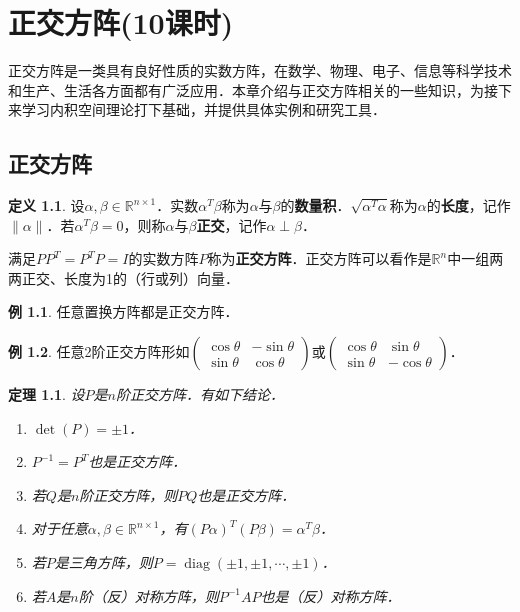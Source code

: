 \documentclass[a4paper,fontset=windows]{ctexbook}
\newtheorem{theorem}{定理}[chapter]
\theoremstyle{definition}
\newtheorem{definition}{定义}[chapter]
\newtheorem{example}{例}[chapter]
\DeclareMathOperator{\diag}{diag}
\begin{document}
\chapter{正交方阵(10课时)}%

正交方阵是一类具有良好性质的实数方阵，在数学、物理、电子、信息等科学技术和生产、生活各方面都有广泛应用．本章介绍与正交方阵相关的一些知识，为接下来学习内积空间理论打下基础，并提供具体实例和研究工具．

\section{正交方阵}

\begin{definition}
设$\alpha,\beta\in\mathbb{R}^{n\times 1}$．实数$\alpha^T\beta$称为$\alpha$与$\beta$的{\bf 数量积}．$\sqrt{\alpha^T\alpha}$称为$\alpha$的{\bf 长度}，记作$\|\alpha\|$．若$\alpha^T\beta=0$，则称$\alpha$与$\beta${\bf 正交}，记作$\alpha\perp\beta$．

满足$PP^T=P^TP=I$的实数方阵$P$称为{\bf 正交方阵}．正交方阵可以看作是$\mathbb{R}^n$中一组两两正交、长度为1的（行或列）向量．
\end{definition}

\begin{example}
任意置换方阵都是正交方阵．
\end{example}

\begin{example}
任意2阶正交方阵形如$\begin{pmatrix}\cos\theta&-\sin\theta \\ \sin\theta&\cos\theta\end{pmatrix}$或$\begin{pmatrix}\cos\theta&\sin\theta \\ \sin\theta&-\cos\theta\end{pmatrix}$．
\end{example}

\begin{theorem}\label{thm6.1}
设$P$是$n$阶正交方阵．有如下结论．
\begin{enumerate}
\item $\det(P)=\pm 1$．

\item $P^{-1}=P^T$也是正交方阵．

\item 若$Q$是$n$阶正交方阵，则$PQ$也是正交方阵．

\item 对于任意$\alpha,\beta\in\mathbb{R}^{n\times 1}$，有$(P\alpha)^T(P\beta)=\alpha^T\beta$．

\item 若$P$是三角方阵，则$P=\diag(\pm 1,\pm 1,\cdots,\pm 1)$．

\item 若$A$是$n$阶（反）对称方阵，则$P^{-1}AP$也是（反）对称方阵．
\end{enumerate}
\end{theorem}
\end{document}
